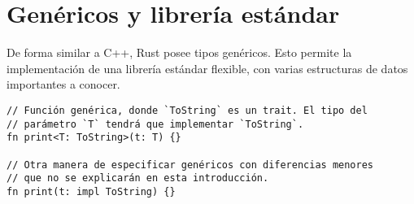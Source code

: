 \section{Genéricos y librería estándar}

De forma similar a C++, Rust posee tipos genéricos. Esto permite la
implementación de una librería estándar flexible, con varias estructuras de
datos importantes a conocer.

\begin{verbatim}
// Función genérica, donde `ToString` es un trait. El tipo del
// parámetro `T` tendrá que implementar `ToString`.
fn print<T: ToString>(t: T) {}

// Otra manera de especificar genéricos con diferencias menores
// que no se explicarán en esta introducción.
fn print(t: impl ToString) {}
\end{verbatim}

